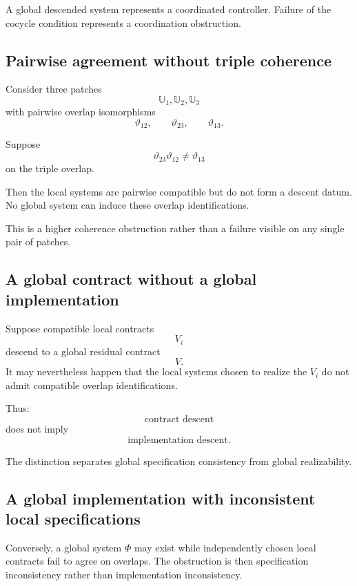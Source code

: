 A global descended system represents a coordinated controller. Failure of the
cocycle condition represents a coordination obstruction.

\subsection{Pairwise agreement without triple coherence}
\label{subsec:example-pairwise-without-triple-coherence}

Consider three patches
\[
    \mathbb U_1,\mathbb U_2,\mathbb U_3
\]
with pairwise overlap isomorphisms
\[
    \vartheta_{12},
    \qquad
    \vartheta_{23},
    \qquad
    \vartheta_{13}.
\]

Suppose
\[
    \vartheta_{23}\vartheta_{12}
    \neq
    \vartheta_{13}
\]
on the triple overlap.

Then the local systems are pairwise compatible but do not form a descent
datum. No global system can induce these overlap identifications.

This is a higher coherence obstruction rather than a failure visible on any
single pair of patches.

\subsection{A global contract without a global implementation}
\label{subsec:example-global-contract-no-implementation}

Suppose compatible local contracts
\[
    V_i
\]
descend to a global residual contract
\[
    V.
\]
It may nevertheless happen that the local systems chosen to realize the
\(V_i\) do not admit compatible overlap identifications.

Thus:
\[
    \text{contract descent}
\]
does not imply
\[
    \text{implementation descent}.
\]

The distinction separates global specification consistency from global
realizability.

\subsection{A global implementation with inconsistent local specifications}
\label{subsec:example-global-implementation-inconsistent-specifications}

Conversely, a global system \(\Phi\) may exist while independently chosen
local contracts fail to agree on overlaps. The obstruction is then
specification inconsistency rather than implementation inconsistency.

